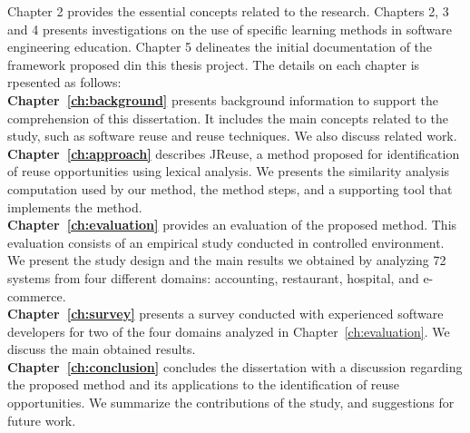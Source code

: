Chapter 2 provides the essential concepts related to the research. Chapters 2, 3 and 4 presents investigations on the use of specific learning methods in software engineering education. Chapter 5 delineates the initial documentation of the framework proposed din this thesis project. The details on each chapter is rpesented as follows:\\

\noindent
\textbf{Chapter~\ref{ch:background}} presents background information to support the comprehension of this dissertation. It includes the main concepts related to the study, such as software reuse and reuse techniques. We also discuss related work.\\

\noindent
\textbf{Chapter~\ref{ch:approach}} describes JReuse, a method proposed for identification of reuse opportunities using lexical analysis. We presents the similarity analysis computation used by our method, the method steps, and a supporting tool that implements the method.\\

\noindent
\textbf{Chapter~\ref{ch:evaluation}} provides an evaluation of the proposed method. This evaluation consists of an empirical study conducted in controlled environment. We present the study design and the main results we obtained by analyzing 72 systems from four different domains: accounting, restaurant, hospital, and e-commerce.\\

\noindent
\textbf{Chapter~\ref{ch:survey}} presents a survey conducted with experienced software developers for two of the four domains analyzed in Chapter~\ref{ch:evaluation}. We discuss the main obtained results.\\

\noindent
\textbf{Chapter~\ref{ch:conclusion}} concludes the dissertation with a discussion regarding the proposed method and its applications to the identification of reuse opportunities. We summarize the contributions of the study, and suggestions for future work.